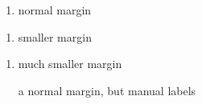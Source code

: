 \documentclass{beamer}
\begin{document}
\begin{frame}
    \begin{enumerate}
        \item normal margin
    \end{enumerate}
    \begin{enumerate}[i]
        \item smaller margin
    \end{enumerate}
    {
    \begin{enumerate}
        \item much smaller margin
    \end{enumerate}
    }
    \begin{enumerate}
        \item[a] normal margin, but manual labels
    \end{enumerate}
\end{frame}
\end{document}
